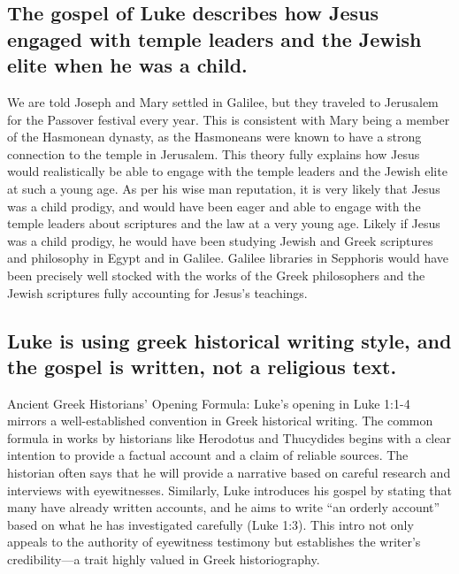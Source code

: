 \subsection{The gospel of Luke describes how Jesus engaged with temple leaders and the Jewish elite when he was a child.}\label{subsec:the-gospel-of-luke-describes-how-jesus-engaged-with-temple-leaders-and-the-jewish-elite-when-he-was-a-child.}

We are told Joseph and Mary settled in Galilee, but they traveled to Jerusalem for the Passover festival every year.
This is consistent with Mary being a member of the Hasmonean dynasty, as the Hasmoneans were known to have a strong connection to the temple in Jerusalem.
This theory fully explains how Jesus would realistically be able to engage with the temple leaders and the Jewish elite at such a young age.
As per his wise man reputation, it is very likely that Jesus was a child prodigy, and would have been eager and able to engage with the temple leaders about scriptures and the law at a very young age.
Likely if Jesus was a child prodigy, he would have been studying Jewish and Greek scriptures and philosophy in Egypt and in Galilee.
Galilee libraries in Sepphoris would have been precisely well stocked with the works of the Greek philosophers and the Jewish scriptures fully accounting for Jesus's teachings.

\subsection{Luke is using greek historical writing style, and the gospel is written, not a religious text.}\label{subsec:luke-is-using-greek-historical-writing-style-and-the-gospel-is-written-not-a-religious-text.}

Ancient Greek Historians' Opening Formula: Luke's opening in Luke 1:1-4 mirrors a well-established convention in Greek historical writing.
The common formula in works by historians like Herodotus and Thucydides begins with a clear intention to provide a factual account and a claim of reliable sources.
The historian often says that he will provide a narrative based on careful research and interviews with eyewitnesses.
Similarly, Luke introduces his gospel by stating that many have already written accounts, and he aims to write ``an orderly account'' based on what he has investigated carefully (Luke 1:3).
This intro not only appeals to the authority of eyewitness testimony but establishes the writer's credibility---a trait highly valued in Greek historiography.

